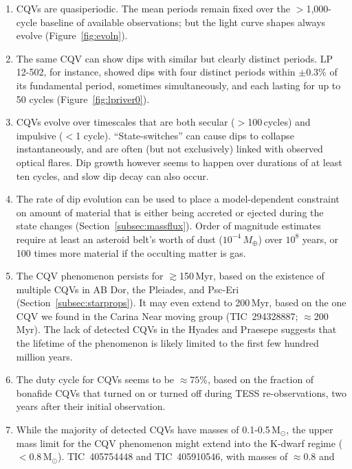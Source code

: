 \documentclass[11pt,twocolumn,tighten]{aastex63}
\begin{document}
\begin{enumerate}[leftmargin=*]
  \item CQVs are quasiperiodic.  The mean periods 
    remain fixed over the $>$1{,}000-cycle baseline of available
    observations; but the light curve shapes always evolve (Figure~\ref{fig:evoln}).
  \item The same CQV can show dips with similar but clearly
    distinct periods.  LP 12-502, for instance, showed dips with four
    distinct periods within $\pm 0.3\%$ of its fundamental period,
    sometimes simultaneously, and each lasting for up to 50 cycles
    (Figure~\ref{fig:lpriver0}).
    \item CQVs evolve over timescales that are both secular
    ($>$100\,cycles) and impulsive ($<$1 cycle).  ``State-switches''
    can cause dips to collapse instantaneously, and are often (but not
    exclusively) linked with observed optical flares.  Dip growth
    however seems to happen over durations of at least ten cycles, and
    slow dip decay can also occur.
    \item The rate of dip evolution can be used to place a model-dependent
    constraint on amount of material that is either being accreted or ejected
    during the state changes (Section~\ref{subsec:massflux}).
    Order of magnitude estimates require at least an asteroid belt's worth
    of dust ($10^{-4}$\,$M_\oplus$) over $10^8$ years, or 100 times more 
    material if the occulting matter is gas.
  \item The CQV phenomenon persists for $\gtrsim$150\,Myr, based on
    the existence of multiple CQVs in AB Dor, the Pleiades, and
    Psc-Eri (Section~\ref{subsec:starprops}).  It may even extend to
    200\,Myr, based on the one CQV we found in the Carina Near
    moving group (TIC~294328887; $\approx$200\,Myr).  The lack of
    detected CQVs in the Hyades and Praesepe suggests that the
    lifetime of the phenomenon is likely limited to the first few
    hundred million years.
    \item The duty cycle for CQVs seems to be $\approx 75$\%, based on
    the fraction of bonafide CQVs that turned on or turned off during
    TESS re-observations, two years after their initial observation.
    \item While the majority of detected CQVs have masses of
    0.1-0.5\,M$_\odot$, the upper mass limit for the CQV phenomenon
    might extend into the K-dwarf regime ($<$$0.8$\,M$_\odot$).
    TIC~405754448 and TIC~405910546, with masses of $\approx$0.8 and
$$
\end{enumerate}
\end{document}
